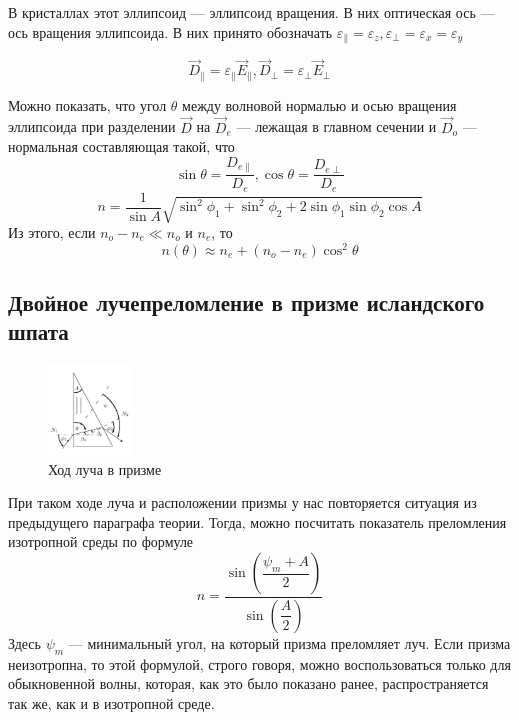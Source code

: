 \documentclass[a4paper, 12pt]{article}%
\begin{document}
В кристаллах этот эллипсоид --- эллипсоид вращения. В них оптическая ось --- ось вращения эллипсоида. В них принято обозначать $\varepsilon_{\parallel} = \varepsilon_z, \varepsilon_{\perp} = \varepsilon_x = \varepsilon_y$

\begin{equation}
\vec{D}_{\parallel} = \varepsilon_{\parallel} \vec{E}_{\parallel},\vec{D}_{\perp} = \varepsilon_{\perp} \vec{E}_{\perp} 
\end{equation}

Можно показать, что угол $\theta$ между волновой нормалью и осью вращения эллипсоида при разделении $\vec{D}$ на $\vec{D}_e$ --- лежащая в главном сечении и $\vec{D}_o$ --- нормальная составляющая такой, что
\begin{equation}
\sin \theta = \dfrac{D_{e\parallel}}{D_e}, \cos \theta = \dfrac{D_{e\perp}}{D_e}
\end{equation}
\begin{equation}
n = \dfrac{1}{\sin A}\sqrt{\sin^2 \phi_1 + \sin^2 \phi_2 + 2 \sin \phi_1 \sin \phi_2 \cos A}
\end{equation}
Из этого, если $n_o - n_e \ll n_o$ и $n_e$, то 
\begin{equation}
n(\theta) \approx n_e + (n_o - n_e) \cos^2 \theta
\end{equation}
\subsection*{Двойное лучепреломление в призме исландского шпата}
\begin{figure}
  \begin{center}
    \includegraphics[width = 0.2\textwidth]{1.png}
  \end{center}
  \caption{Ход луча в призме}
\end{figure}
При таком ходе луча и расположении призмы у нас повторяется ситуация из предыдущего параграфа теории. Тогда, можно посчитать показатель преломления изотропной среды по формуле 
\begin{equation}
n = \dfrac{\sin\left(\dfrac{\psi_m + A}{2}\right)}{\sin \left(\dfrac{A}{2}\right)}
\end{equation}
Здесь $\psi_m$  --- минимальный угол, на который призма преломляет луч.
Если призма неизотропна, то этой формулой, строго говоря, можно воспользоваться только для обыкновенной волны, которая, как это было показано ранее, распространяется так же, как и в изотропной среде. 
\end{document}
